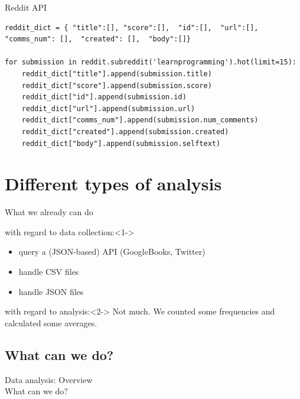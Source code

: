\documentclass{beamer}
\begin{document}
\begin{frame}[fragile]{Reddit API}
\begin{lstlisting}
reddit_dict = { "title":[], "score":[],  "id":[],  "url":[], "comms_num": [],  "created": [],  "body":[]}

for submission in reddit.subreddit('learnprogramming').hot(limit=15):
    reddit_dict["title"].append(submission.title)
    reddit_dict["score"].append(submission.score)
    reddit_dict["id"].append(submission.id)
    reddit_dict["url"].append(submission.url)
    reddit_dict["comms_num"].append(submission.num_comments)
    reddit_dict["created"].append(submission.created)
    reddit_dict["body"].append(submission.selftext)

\end{lstlisting}
\end{frame}




\section{Different types of analysis}

\begin{frame}{What we already can do}
\begin{block}{with regard to data collection:}<1->
\begin{itemize}
\item query a (JSON-based) API (GoogleBooks, Twitter)
\item handle CSV files
\item handle JSON files 
\end{itemize}
\end{block}

\begin{block}{with regard to analysis:}<2->
Not much. We counted some frequencies and calculated some averages.
\end{block}

\end{frame}


\subsection{What can we do?}
\begin{frame}
Data analysis: Overview\\
What can we do? \\ ~\\
\end{frame}
\end{document}

